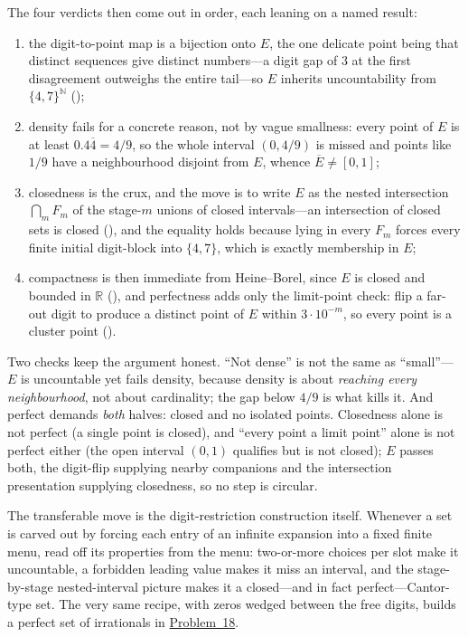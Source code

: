 \documentclass[main.tex]{subfiles}
\begin{document}
\begin{Reflection}
The four verdicts then come out in order, each leaning on a named result:
\begin{enumerate}[leftmargin=1.7em,itemsep=3pt,topsep=2pt,label=\textnormal{(\arabic*)}]
  \item the digit-to-point map is a bijection onto $E$, the one delicate point being that distinct
        sequences give distinct numbers---a digit gap of $3$ at the first disagreement outweighs the
        entire tail---so $E$ inherits uncountability from $\{4,7\}^{\mathbb N}$
        ();
  \item density fails for a concrete reason, not by vague smallness: every point of $E$ is at least
        $0.4\overline 4=4/9$, so the whole interval $(0,4/9)$ is missed and points like $1/9$ have a
        neighbourhood disjoint from $E$, whence $\overline E\ne[0,1]$;
  \item closedness is the crux, and the move is to write $E$ as the nested intersection
        $\bigcap_m F_m$ of the stage-$m$ unions of closed intervals---an intersection of closed sets is
        closed (), and the equality holds because lying in every
        $F_m$ forces every finite initial digit-block into $\{4,7\}$, which is exactly membership in $E$;
  \item compactness is then immediate from Heine--Borel, since $E$ is closed and bounded in $\mathbb R$
        (), and perfectness adds only the limit-point check: flip a
        far-out digit to produce a distinct point of $E$ within $3\cdot 10^{-m}$, so every point is a
        cluster point ().
\end{enumerate}

Two checks keep the argument honest. ``Not dense'' is not the same as ``small''---$E$ is uncountable yet
fails density, because density is about \emph{reaching every neighbourhood}, not about cardinality; the
gap below $4/9$ is what kills it. And perfect demands \emph{both} halves: closed and no isolated points.
Closedness alone is not perfect (a single point is closed), and ``every point a limit point'' alone is
not perfect either (the open interval $(0,1)$ qualifies but is not closed); $E$ passes both, the
digit-flip supplying nearby companions and the intersection presentation supplying closedness, so no step
is circular.

The transferable move is the digit-restriction construction itself. Whenever a set is carved out by
forcing each entry of an infinite expansion into a fixed finite menu, read off its properties from the
menu: two-or-more choices per slot make it uncountable, a forbidden leading value makes it miss an
interval, and the stage-by-stage nested-interval picture makes it a closed---and in fact perfect---Cantor-type
set. The very same recipe, with zeros wedged between the free digits, builds a perfect set of irrationals
in \hyperlink{prob:18}{Problem~18}.
\end{Reflection}
\end{document}
